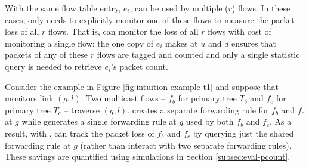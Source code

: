
With \merge the same flow table entry, $e_i$, can be used by multiple ($r$) flows.  In these cases, \pcnt only needs to explicitly monitor one of these flows to measure
the packet loss of all $r$ flows.  That is, \pcnt can monitor the loss of all $r$ flows with cost of monitoring a single flow:
the one copy of $e_i$ \pcnt makes at $u$ and $d$ ensures that packets of any of these $r$ flows are tagged and counted and
only a single statistic query is needed to retrieve $e_i$'s packet count.

Consider the example in Figure \ref{fig:intuition-example-t1} and suppose that \pcnt monitors link $(g,l)$. 
Two multicast flows -- $f_b$ for primary tree $T_b$ and $f_c$ for primary tree $T_c$ -- traverse
$(g,l)$.  \base creates a separate forwarding rule for $f_b$ and $f_c$ at $g$ while \merge generates a single forwarding rule at $g$ used by both $f_b$ and $f_c$.  As a result, 
with \merges, \pcnt can track the  packet loss of $f_b$ and $f_c$ by querying just the shared \merge forwarding rule at $g$ (rather than interact with two separate \base forwarding rules).
These savings are quantified using simulations in Section \ref{subsec:eval-pcount}.





